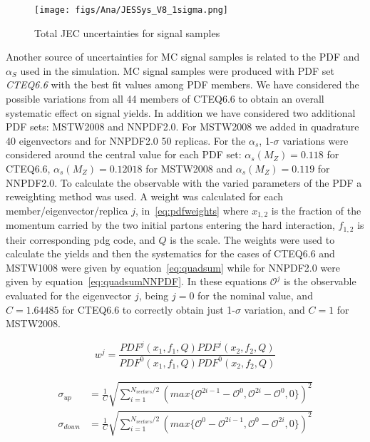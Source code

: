 \begin{figure}[!Hhtbp]
  \begin{center}
    \texttt{[image: figs/Ana/JESSys\_V8\_1sigma.png]}
    \caption{Total JEC uncertainties for signal samples}
    \label{fig:TotalJECSys}
  \end{center}
\end{figure}

Another source of uncertainties for MC signal samples is related to the PDF and $\alpha_{S}$ used in the simulation. MC signal samples were produced with PDF set \textit{CTEQ6.6} with the best fit values among PDF members. We have considered the possible variations from all 44 members of CTEQ6.6 to obtain an overall systematic effect on signal yields. In addition we have considered two additional PDF sets: MSTW2008 and NNPDF2.0. For MSTW2008 we added in quadrature 40 eigenvectors and for NNPDF2.0 50 replicas. For the $\alpha_{s}$, 1-$\sigma$ variations were considered around the central value for each PDF set: $\alpha_{s}(M_{Z})=0.118$ for CTEQ6.6, $\alpha_{s}(M_{Z})=0.12018$ for MSTW2008 and $\alpha_{s}(M_{Z})=0.119$ for NNPDF2.0. To calculate the observable with the varied parameters of the PDF a reweighting method was used. A weight was calculated for each member/eigenvector/replica $j$, in~\ref{eq:pdfweights} where $x_{1,2}$ is the fraction of the momentum carried by the two initial partons entering the hard interaction, $f_{1,2}$ is their corresponding pdg code, and $Q$ is the scale. The weights were used to calculate the yields and then the systematics for the cases of CTEQ6.6 and MSTW1008 were given by equation~\ref{eq:quadsum} while for NNPDF2.0 were given by equation~\ref{eq:quadsumNNPDF}. In these equations $\mathcal{O}^{j}$ is the observable evaluated for the eigenvector $j$, being $j=0$ for the nominal value, and $C=1.64485$ for CTEQ6.6 to correctly obtain just 1-$\sigma$ variation, and $C=1$ for MSTW2008.

\begin{equation} \label{eq:pdfweights}
w^{j}=\frac{PDF^{j}(x_{1},f_{1},Q)PDF^{j}(x_{2},f_{2},Q)}{PDF^{0}(x_{1},f_{1},Q)PDF^{0}(x_{2},f_{2},Q)}
\end{equation}

\begin{align} \label{eq:quadsum}
\sigma_{up} & = \frac{1}{C}\sqrt{\sum_{i=1}^{N_{vectors}/2}(max\{\mathcal{O}^{2i-1}-\mathcal{O}^{0},\mathcal{O}^{2i}-\mathcal{O}^{0},0\})^{2}} \nonumber\\
\sigma_{down} & = \frac{1}{C}\sqrt{\sum_{i=1}^{N_{vectors}/2}(max\{\mathcal{O}^{0}-\mathcal{O}^{2i-1},\mathcal{O}^{0}-\mathcal{O}^{2i},0\})^{2}}
\end{align}

